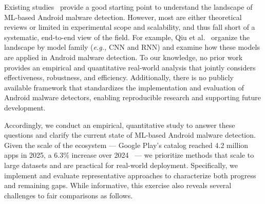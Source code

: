 Existing studies~\cite{faruki2014android,qiu2020survey,liu2022deep,gao2024comprehensive} provide a good starting point to understand the landscape of ML-based Android malware detection.
However, most are either theoretical reviews or limited in experimental scope and scalability, and thus fall short of a systematic, end-to-end view of the field.
For example, Qiu et al.~\cite{qiu2020survey} organize the landscape by model family (\textit{e.g.,} CNN and RNN) and examine how these models are applied in Android malware detection.
To our knowledge, no prior work provides an empirical and quantitative real-world analysis that jointly considers effectiveness, robustness, and efficiency.
Additionally, there is no publicly available framework that standardizes the implementation and evaluation of Android malware detectors, enabling reproducible research and supporting future development.

Accordingly, we conduct an empirical, quantitative study to answer these questions and clarify the current state of ML-based Android malware detection.
Given the scale of the ecosystem --- Google Play's catalog reached 4.2 million apps in 2025, a 6.3\% increase over 2024~\cite{appnumber} --- we prioritize methods that scale to large datasets and are practical for real-world deployment.
Specifically, we implement and evaluate representative approaches to characterize both progress and remaining gaps.
While informative, this exercise also reveals several challenges to fair comparisons as follows.


